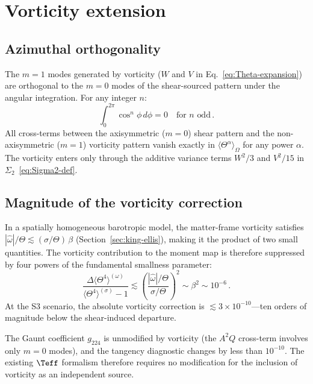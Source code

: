 \section{Vorticity extension}\label{sec:teff-vort}

\subsection{Azimuthal orthogonality}\label{sec:azimuth}

The $m = 1$ modes generated by vorticity ($W$ and $V$ in
Eq.~\eqref{eq:Theta-expansion}) are orthogonal to the $m = 0$
modes of the shear-sourced pattern under the angular
integration.  For any integer $n$:
\begin{equation}\label{eq:azimuth-orth}
\int_0^{2\pi}\cos^n\!\phi\,d\phi = 0
\quad\text{for $n$ odd}\,.
\end{equation}
All cross-terms between the axisymmetric ($m = 0$) shear
pattern and the non-axisymmetric ($m = 1$) vorticity pattern
vanish exactly in $\langle\Theta^\alpha\rangle_\Omega$ for any
power $\alpha$.  The vorticity enters only through the additive
variance terms $W^2/3$ and $V^2/15$ in
$\Sigma_2$~\eqref{eq:Sigma2-def}.


\subsection{Magnitude of the vorticity correction}
\label{sec:vort-magnitude}

In a spatially homogeneous barotropic model, the matter-frame
vorticity satisfies
$|\hat{\omega}|/\Theta \lesssim (\sigma/\Theta)\,\beta$
(Section~\ref{sec:king-ellis}), making it the product of two
small quantities.  The vorticity contribution to the moment map
is therefore suppressed by four powers of the fundamental
smallness parameter:
\begin{equation}\label{eq:vort-suppression}
\frac{\Delta\langle\Theta^4\rangle^{(\omega)}}
     {\langle\Theta^4\rangle^{(\sigma)} - 1}
\lesssim
\left(\frac{|\hat{\omega}|/\Theta}{\sigma/\Theta}\right)^2
\sim \beta^2
\sim 10^{-6}\,.
\end{equation}
At the S3 scenario, the absolute vorticity correction is
$\lesssim 3 \times 10^{-10}$---ten orders of magnitude below
the shear-induced departure.

The Gaunt coefficient $g_{224}$ is unmodified by vorticity (the
$A^2 Q$ cross-term involves only $m = 0$ modes), and the
tangency diagnostic changes by less than $10^{-10}$.  The
existing $\Teff$ formalism therefore requires no modification
for the inclusion of vorticity as an independent source.



